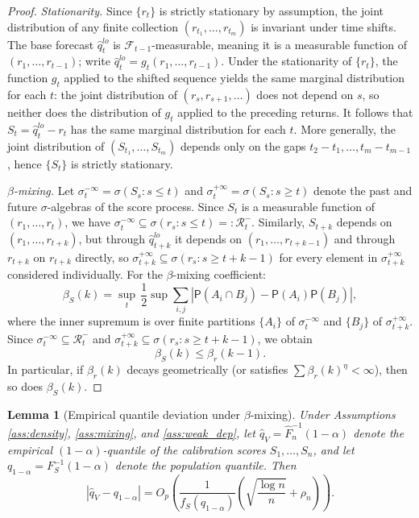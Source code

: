 \documentclass[preprint,11pt,authoryear]{elsarticle}
\newtheorem{lemma}[theorem]{Lemma}
\renewcommand{\P}{\mathsf{P}}
\newcommand{\1}{\boldsymbol{1}}
\begin{document}
	\begin{proof}
		\textit{Stationarity.}\enspace
		Since $\{r_t\}$ is strictly stationary by assumption, the joint distribution of any finite collection $(r_{t_1},\ldots,r_{t_m})$ is invariant under time shifts.
		The base forecast $\hat q_t^{lo}$ is $\mathcal F_{t-1}$-measurable, meaning it is a measurable function of $(r_1,\ldots,r_{t-1})$; write $\hat q_t^{lo}=g_t(r_1,\ldots,r_{t-1})$. Under the stationarity of $\{r_t\}$, the function $g_t$ applied to the shifted sequence yields the same marginal distribution for each $t$: the joint distribution of $(r_s,r_{s+1},\ldots)$ does not depend on $s$, so neither does the distribution of $g_t$ applied to the preceding returns. It follows that $S_t = \hat q_t^{lo}-r_t$ has the same marginal distribution for each $t$. More generally, the joint distribution of $(S_{t_1},\ldots,S_{t_m})$ depends only on the gaps $t_2-t_1,\ldots,t_m-t_{m-1}$, hence $\{S_t\}$ is strictly stationary.
		
		\textit{$\beta$-mixing.}\enspace
		Let $\sigma^{-\infty}_t = \sigma(S_s : s \le t)$ and $\sigma_t^{+\infty} = \sigma(S_s : s \ge t)$ denote the past and future $\sigma$-algebras of the score process.
		Since $S_t$ is a measurable function of $(r_1,\ldots,r_t)$, we have
		$\sigma^{-\infty}_t \subseteq \sigma(r_s : s \le t) =: \mathcal R_t^-$.
		Similarly, $S_{t+k}$ depends on $(r_1,\ldots,r_{t+k})$, but through $\hat q_{t+k}^{lo}$ it depends on $(r_1,\ldots,r_{t+k-1})$ and through $r_{t+k}$ on $r_{t+k}$ directly, so
		$\sigma_{t+k}^{+\infty} \subseteq \sigma(r_s : s \ge t+k-1)$
		for every element in $\sigma_{t+k}^{+\infty}$ considered individually. For the $\beta$-mixing coefficient:
		\[
		\beta_S(k) = \sup_t \, \frac{1}{2}\sup\sum_{i,j}|\P(A_i \cap B_j)-\P(A_i)\P(B_j)|,
		\]
		where the inner supremum is over finite partitions $\{A_i\}$ of $\sigma_t^{-\infty}$ and $\{B_j\}$ of $\sigma_{t+k}^{+\infty}$. Since $\sigma_t^{-\infty} \subseteq \mathcal R_t^-$ and $\sigma_{t+k}^{+\infty} \subseteq \sigma(r_s : s \ge t+k-1)$, we obtain
		\[
		\beta_S(k) \le \beta_r(k-1).
		\]
		In particular, if $\beta_r(k)$ decays geometrically (or satisfies $\sum \beta_r(k)^\eta < \infty$), then so does $\beta_S(k)$.
	\end{proof}
	
	\begin{lemma}[Empirical quantile deviation under $\beta$-mixing]
		\label{lem:quantile_mixing}
		Under Assumptions \ref{ass:density}, \ref{ass:mixing}, and \ref{ass:weak_dep}, let $\hat q_V = \hat F_n^{-1}(1-\alpha)$ denote the empirical $(1-\alpha)$-quantile of the calibration scores $S_1,\ldots,S_n$, and let $q_{1-\alpha}=F_S^{-1}(1-\alpha)$ denote the population quantile. Then
		\[
		|\hat q_V - q_{1-\alpha}|
		=
		O_p\!\left(\frac{1}{f_S(q_{1-\alpha})}\left(\sqrt{\frac{\log n}{n}}+\rho_n\right)\right).
		\]
	\end{lemma}
	
\end{document}
